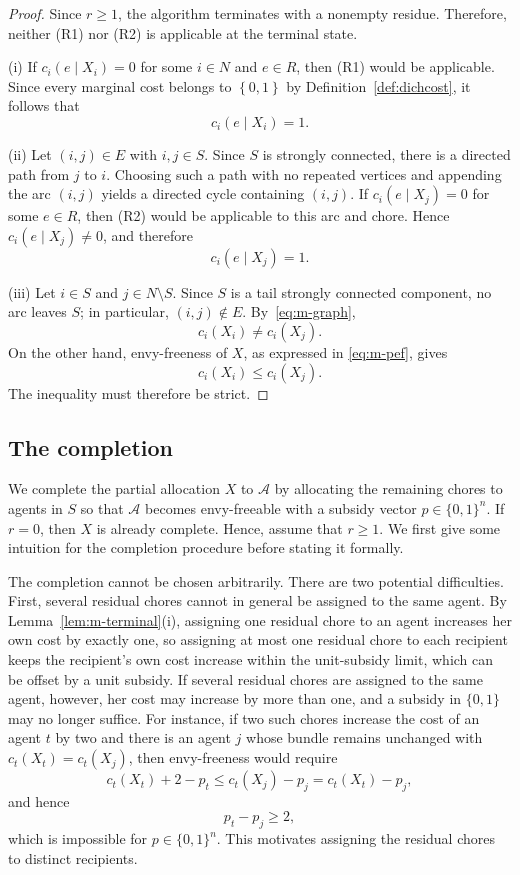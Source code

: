 \documentclass[sigconf,anonymous]{aamas}
\newcommand{\agents}{N}
\newcommand{\cost}{c}
\newcommand{\set}[1]{\left\{#1\right\}}
\theoremstyle{acmplain}
\theoremstyle{acmdefinition}
\theoremstyle{acmplain}
\begin{document}
\begin{proof} Since $r\geq 1$, the algorithm terminates with a nonempty residue. Therefore, neither \textnormal{(R1)} nor \textnormal{(R2)} is applicable at the terminal state.

(i) If $\cost_i(e\mid X_i)=0$ for some $i\in\agents$ and $e\in R$, then \textnormal{(R1)} would be applicable. Since every marginal cost belongs to $\set{0,1}$ by Definition~\ref{def:dichcost}, it follows that
\[
    \cost_i(e\mid X_i)=1.
\]

(ii) Let $(i,j)\in E$ with $i,j\in S$. Since $S$ is strongly connected, there is a directed path from $j$ to $i$. Choosing such a path with no repeated vertices and appending the arc $(i,j)$ yields a directed cycle containing $(i,j)$. If $\cost_i(e\mid X_j)=0$ for some $e\in R$, then \textnormal{(R2)} would be applicable to this arc and chore. Hence $\cost_i(e\mid X_j)\neq 0$, and therefore
\[
    \cost_i(e\mid X_j)=1.
\]

(iii) Let $i\in S$ and $j\in\agents\setminus S$. Since $S$ is a tail strongly connected component, no arc leaves $S$; in particular, $(i,j)\notin E$. By~\eqref{eq:m-graph},
\[
    \cost_i(X_i)\neq \cost_i(X_j).
\]
On the other hand, envy-freeness of $X$, as expressed in \eqref{eq:m-pef}, gives
\[
    \cost_i(X_i)\leq \cost_i(X_j).
\]
The inequality must therefore be strict.
\end{proof}
\subsection{The completion}
\label{sec:m-completion}
We complete the partial allocation $X$ to $\mathcal{A}$ by allocating the remaining chores to agents in $S$ so that $\mathcal{A}$ becomes envy-freeable with a subsidy vector $p\in\{0,1\}^n$. If $r=0$, then $X$ is already complete. Hence, assume that $r\geq 1$. We first give some intuition for the completion procedure before stating it formally.

The completion cannot be chosen arbitrarily. There are two potential difficulties. First, several residual chores cannot in general be assigned to the same agent. By Lemma~\ref{lem:m-terminal}(i), assigning one residual chore to an agent increases her own cost by exactly one, so assigning at most one residual chore to each recipient keeps the recipient's own cost increase within the unit-subsidy limit, which can be offset by a unit subsidy. If several residual chores are assigned to the same agent, however, her cost may increase by more than one, and a subsidy in $\{0,1\}$ may no longer suffice. For instance, if two such chores increase the cost of an agent $t$ by two and there is an agent $j$ whose bundle remains unchanged with $c_t(X_t)=c_t(X_j)$, then envy-freeness would require
\[
c_t(X_t)+2-p_t
   \leq c_t(X_j)-p_j
   =c_t(X_t)-p_j,
\]
and hence
\[
p_t-p_j\geq 2,
\]
which is impossible for $p\in\{0,1\}^n$. This motivates assigning the residual chores to distinct recipients.
\end{document}
